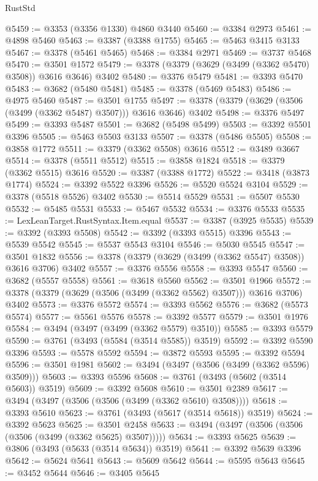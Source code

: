 \begin{lexlean}{RustStd}
\begin{coremodule}
@5459 := @3353 (@3356 @1330) @4860 @3440
@5460 := @3384 @2973
@5461 := @4898 @5460
@5463 := @3387 (@3388 @1755)
@5465 := @5463 @3415 @3133
@5467 := @3378 (@5461 @5465)
@5468 := @3384 @2971
@5469 := @3737 @5468
@5470 := @3501 @1572
@5479 := @3378 (@3379 (@3629 (@3499 (@3362 @5470) @3508)) @3616 @3646) @3402
@5480 := @3376 @5479
@5481 := @3393 @5470
@5483 := @3682 (@5480 @5481)
@5485 := @3378 (@5469 @5483)
@5486 := @4975 @5460
@5487 := @3501 @1755
@5497 := @3378 (@3379 (@3629 (@3506 (@3499 (@3362 @5487) @3507))) @3616 @3646) @3402
@5498 := @3376 @5497
@5499 := @3393 @5487
@5501 := @3682 (@5498 @5499)
@5503 := @3392 @5501 @3396
@5505 := @5463 @5503 @3133
@5507 := @3378 (@5486 @5505)
@5508 := @3858 @1772
@5511 := @3379 (@3362 @5508) @3616
@5512 := @3489 @3667
@5514 := @3378 (@5511 @5512)
@5515 := @3858 @1824
@5518 := @3379 (@3362 @5515) @3616
@5520 := @3387 (@3388 @1772)
@5522 := @3418 (@3873 @1774)
@5524 := @3392 @5522 @3396
@5526 := @5520 @5524 @3104
@5529 := @3378 (@5518 @5526) @3402
@5530 := @5514 @5529
@5531 := @5507 @5530
@5532 := @5485 @5531
@5533 := @5467 @5532
@5534 := @3376 @5533
@5535 := LexLeanTarget.RustSyntax.Item.equal
@5537 := @3387 (@3925 @5535)
@5539 := @3392 (@3393 @5508)
@5542 := @3392 (@3393 @5515) @3396
@5543 := @5539 @5542
@5545 := @5537 @5543 @3104
@5546 := @5030 @5545
@5547 := @3501 @1832
@5556 := @3378 (@3379 (@3629 (@3499 (@3362 @5547) @3508)) @3616 @3706) @3402
@5557 := @3376 @5556
@5558 := @3393 @5547
@5560 := @3682 (@5557 @5558)
@5561 := @3618 @5560
@5562 := @3501 @1966
@5572 := @3378 (@3379 (@3629 (@3506 (@3499 (@3362 @5562) @3507))) @3616 @3706) @3402
@5573 := @3376 @5572
@5574 := @3393 @5562
@5576 := @3682 (@5573 @5574)
@5577 := @5561 @5576
@5578 := @3392 @5577
@5579 := @3501 @1976
@5584 := @3494 (@3497 (@3499 (@3362 @5579) @3510))
@5585 := @3393 @5579
@5590 := @3761 (@3493 (@5584 (@3514 @5585)) @3519)
@5592 := @3392 @5590 @3396
@5593 := @5578 @5592
@5594 := @3872 @5593
@5595 := @3392 @5594
@5596 := @3501 @1981
@5602 := @3494 (@3497 (@3506 (@3499 (@3362 @5596) @3509)))
@5603 := @3393 @5596
@5608 := @3761 (@3493 (@5602 (@3514 @5603)) @3519)
@5609 := @3392 @5608
@5610 := @3501 @2389
@5617 := @3494 (@3497 (@3506 (@3506 (@3499 (@3362 @5610) @3508))))
@5618 := @3393 @5610
@5623 := @3761 (@3493 (@5617 (@3514 @5618)) @3519)
@5624 := @3392 @5623
@5625 := @3501 @2458
@5633 := @3494 (@3497 (@3506 (@3506 (@3506 (@3499 (@3362 @5625) @3507)))))
@5634 := @3393 @5625
@5639 := @3806 (@3493 (@5633 (@3514 @5634)) @3519)
@5641 := @3392 @5639 @3396
@5642 := @5624 @5641
@5643 := @5609 @5642
@5644 := @5595 @5643
@5645 := @3452 @5644
@5646 := @3405 @5645

\end{coremodule}
\end{lexlean}
